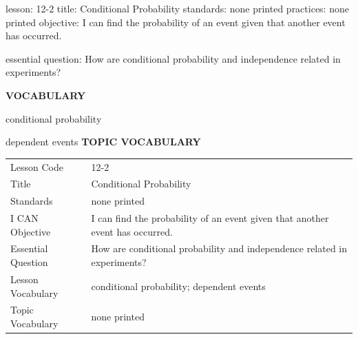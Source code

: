 \documentclass{article}
\newenvironment{lesson-meta}{}{}        %
\newcommand{\te}[1]{}                   %
\begin{document}
\begin{lesson-meta}
lesson: 12-2
title: Conditional Probability
standards: none printed
practices: none printed
objective: I can find the probability of an event given that another event has occurred.

essential question: How are conditional probability and independence related in experiments?

\textbf{VOCABULARY}
\item conditional probability
\item dependent events
\textbf{TOPIC VOCABULARY}
\te{No separate topic vocabulary list is printed on these pages.}
\begin{tabular}{ll}
Lesson Code & 12-2 \\
Title & Conditional Probability \\
Standards & none printed \\
I CAN Objective & I can find the probability of an event given that another event has occurred. \\
Essential Question & How are conditional probability and independence related in experiments? \\
Lesson Vocabulary & conditional probability; dependent events \\
Topic Vocabulary & none printed \\
\end{tabular}
\end{lesson-meta}
\end{document}
